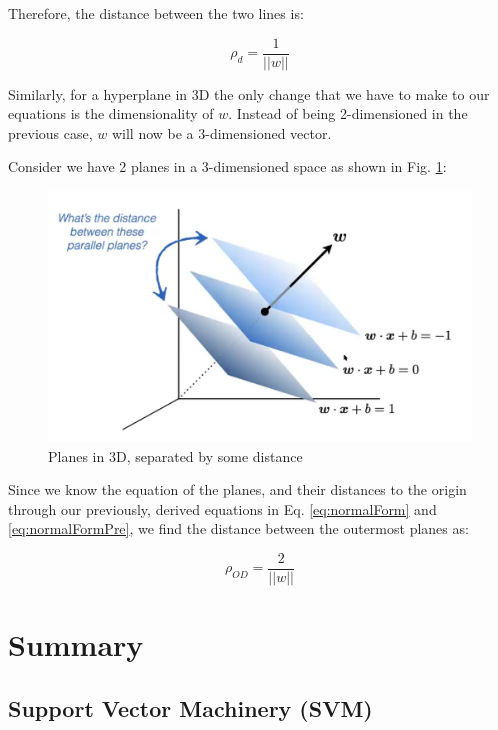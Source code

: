 \documentclass[11pt]{article}
\begin{document}
Therefore, the distance between the two lines is:

\begin{equation} \label{eq:dist2lines}
    \rho_{d} = \dfrac{1}{||w||}
\end{equation}

Similarly, for a hyperplane in 3D the only change that we have to make to our equations is the dimensionality of $w$. Instead of being 2-dimensioned in the previous case, $w$ will now be a 3-dimensioned vector.

Consider we have 2 planes in a 3-dimensioned space as shown in Fig. \ref{fig:3DPlanes}:

\begin{figure}[h]
    \centering
    \includegraphics[scale = 0.285]{figures/3Dplanes.png}
    \caption{Planes in 3D, separated by some distance}
    \label{fig:3DPlanes}
\end{figure}

Since we know the equation of the planes, and their distances to the origin through our previously, derived equations in Eq. \ref{eq:normalForm} and \ref{eq:normalFormPre}, we find the distance between the outermost planes as:

\begin{equation}
    \rho_{OD} = \dfrac{2}{||w||}
\end{equation}

\section{Summary}

\subsection{Support Vector Machinery (SVM)}
\normalfont
\end{document}
